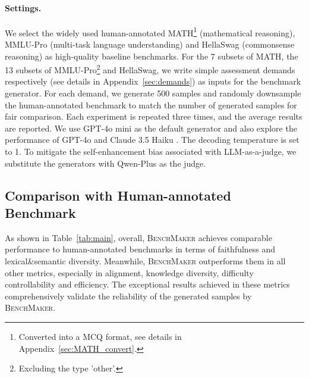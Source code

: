 \paragraph{Settings.}
We select the widely used human-annotated MATH\footnote{Converted into a MCQ format, see details in Appendix~\ref{sec:MATH_convert}.} \citep{math} (mathematical reasoning), MMLU-Pro (multi-task language understanding) \citep{mmlupro} and HellaSwag (commonsense reasoning) \citep{hellaswag} as high-quality baseline benchmarks.
For the 7 subsets of MATH, the 13 subsets of MMLU-Pro\footnote{Excluding the type 'other'.} and HellaSwag, we write simple assessment demands respectively (see details in Appendix~\ref{sec:demands}) as inputs for the benchmark generator. 
For each demand, we generate 500 samples and randomly downsample the human-annotated benchmark to match the number of generated samples for fair comparison.
Each experiment is repeated three times, and the average results are reported.
We use GPT-4o mini \citep{4o} as the default generator and also explore the performance of GPT-4o and Claude 3.5 Haiku \citep{claude}. The decoding temperature is set to 1.
To mitigate the self-enhancement bias \citep{llmasjudge} associated with LLM-as-a-judge, we substitute the generators with Qwen-Plus \citep{qwen} as the judge.

\subsection{Comparison with Human-annotated Benchmark}
As shown in Table~\ref{tab:main}, overall, \textsc{BenchMaker} achieves comparable performance to human-annotated benchmarks in terms of faithfulness and lexical\&semantic diversity. Meanwhile, \textsc{BenchMaker} outperforms them in all other metrics, especially in alignment, knowledge diversity, difficulty controllability and efficiency. 
The exceptional results achieved in these metrics comprehensively validate the reliability of the generated samples by \textsc{BenchMaker}.
